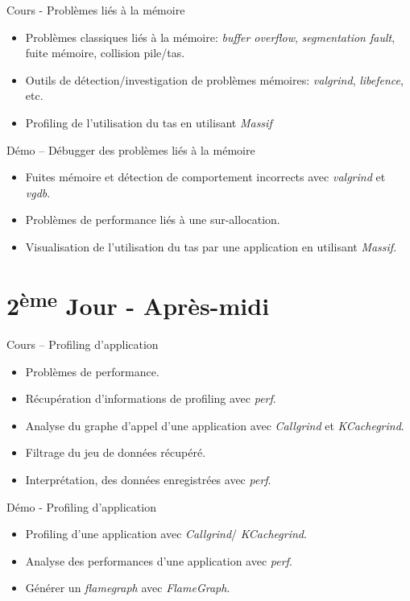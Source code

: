 \documentclass[a4paper,12pt,obeyspaces,spaces,hyphens]{article}
\begin{document}
\feagendatwocolumn
{Cours - Problèmes liés à la mémoire}
{
  \begin{itemize}
  \item Problèmes classiques liés à la mémoire: {\em buffer overflow},
    {\em segmentation fault}, fuite mémoire, collision pile/tas.
  \item Outils de détection/investigation de problèmes mémoires: {\em
      valgrind}, {\em libefence}, etc.
  \item Profiling de l'utilisation du tas en utilisant {\em Massif}
  \end{itemize}
}
{Démo – Débugger des problèmes liés à la mémoire}
{
  \begin{itemize}
  \item Fuites mémoire et détection de comportement incorrects avec
    {\em valgrind} et {\em vgdb}.
  \item Problèmes de performance liés à une sur-allocation.
  \item Visualisation de l'utilisation du tas par une application en
    utilisant {\em Massif}.
  \end{itemize}
}

\section{2\textsuperscript{ème} Jour - Après-midi}

\feagendatwocolumn
{Cours – Profiling d'application}
{
  \begin{itemize}
  \item Problèmes de performance.
  \item Récupération d'informations de profiling avec {\em perf}.
  \item Analyse du graphe d'appel d'une application avec {\em
      Callgrind} et {\em KCachegrind}.
  \item Filtrage du jeu de données récupéré.
  \item Interprétation, des données enregistrées avec {\em perf}.
  \end{itemize}
}
{Démo - Profiling d'application}
{
  \begin{itemize}
  \item Profiling d'une application avec {\em Callgrind}/{\em
      KCachegrind}.
  \item Analyse des performances d'une application avec {\em perf}.
  \item Générer un {\em flamegraph} avec {\em FlameGraph}.
  \end{itemize}
}
\end{document}

